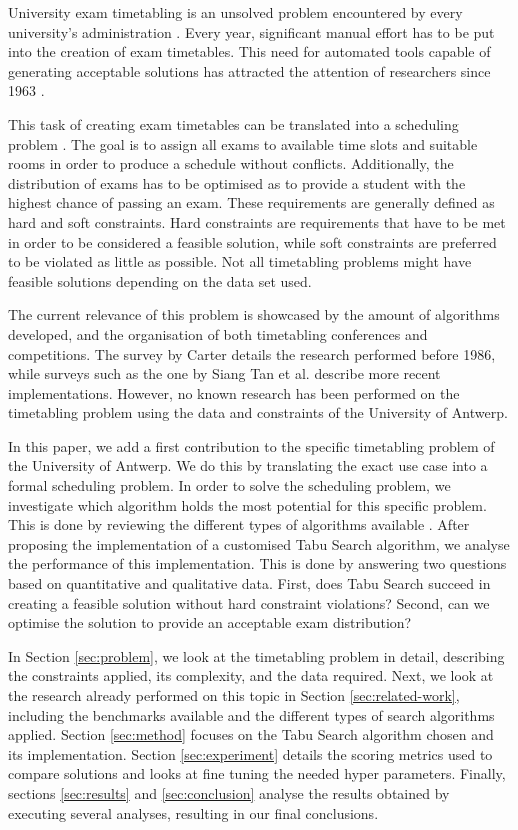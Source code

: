 University exam timetabling is an unsolved problem encountered by every university's administration \cite{even1976}. Every year, significant manual effort has to be put into the creation of exam timetables. This need for automated tools capable of generating acceptable solutions has attracted the attention of researchers since 1963 \cite{gotlieb1963}. 

This task of creating exam timetables can be translated into a scheduling problem \cite{BurkeScheduling2004}. The goal is to assign all exams to available time slots and suitable rooms in order to produce a schedule without conflicts. Additionally, the distribution of exams has to be optimised as to provide a student with the highest chance of passing an exam. These requirements are generally defined as hard and soft constraints. Hard constraints are requirements that have to be met in order to be considered a feasible solution, while soft constraints are preferred to be violated as little as possible. Not all timetabling problems might have feasible solutions depending on the data set used.

The current relevance of this problem is showcased by the amount of algorithms developed, and the organisation of both timetabling conferences and competitions. The survey by Carter \cite{carter1986} details the research performed before 1986, while surveys such as the one by Siang Tan et al. \cite{joo2021} describe more recent implementations. However, no known research has been performed on the timetabling problem using the data and constraints of the University of Antwerp.

In this paper, we add a first contribution to the specific timetabling problem of the University of Antwerp. We do this by translating the exact use case into a formal scheduling problem. In order to solve the scheduling problem, we investigate which algorithm holds the most potential for this specific problem. This is done by reviewing the different types of algorithms available \cite{joo2021, kristiansenSurvey2013, chen2021, rong2009}. After proposing the implementation of a customised Tabu Search algorithm, we analyse the performance of this implementation. This is done by answering two questions based on quantitative and qualitative data. First, does Tabu Search succeed in creating a feasible solution without hard constraint violations? Second, can we optimise the solution to provide an acceptable exam distribution?

In Section \ref{sec:problem}, we look at the timetabling problem in detail, describing the constraints applied, its complexity, and the data required. Next, we look at the research already performed on this topic in Section \ref{sec:related-work}, including the benchmarks available and the different types of search algorithms applied. Section \ref{sec:method} focuses on the Tabu Search algorithm chosen and its implementation. Section \ref{sec:experiment} details the scoring metrics used to compare solutions and looks at fine tuning the needed hyper parameters. Finally, sections \ref{sec:results} and \ref{sec:conclusion} analyse the results obtained by executing several analyses, resulting in our final conclusions. 